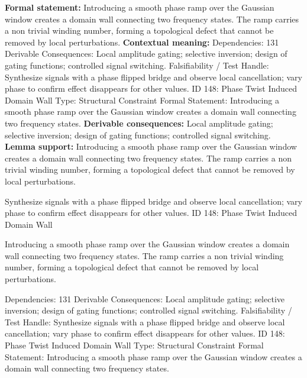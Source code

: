 \begingroup\footnotesize\setlength{\emergencystretch}{3em}\sloppy
\textbf{Formal statement:} Introducing a smooth phase ramp over the Gaussian window creates a domain wall connecting two frequency states. The ramp carries a non trivial winding number, forming a topological defect that cannot be removed by local perturbations.
\textbf{Contextual meaning:} Dependencies: 131 Derivable Consequences: Local amplitude gating; selective inversion; design of gating functions; controlled signal switching. Falsifiability / Test Handle: Synthesize signals with a phase flipped bridge and observe local cancellation; vary phase to confirm effect disappears for other values. ID 148: Phase Twist Induced Domain Wall Type: Structural Constraint Formal Statement: Introducing a smooth phase ramp over the Gaussian window creates a domain wall connecting two frequency states.
\textbf{Derivable consequences:} Local amplitude gating; selective inversion; design of gating functions; controlled signal switching.
\textbf{Lemma support:} Introducing a smooth phase ramp over the Gaussian window creates a domain wall connecting two frequency states. The ramp carries a non trivial winding number, forming a topological defect that cannot be removed by local perturbations.\par
\endgroup

Synthesize signals with a phase flipped bridge and observe local cancellation; vary phase to confirm effect disappears for other values. ID 148: Phase Twist Induced Domain Wall

Introducing a smooth phase ramp over the Gaussian window creates a domain wall connecting two frequency states. The ramp carries a non trivial winding number, forming a topological defect that cannot be removed by local perturbations.

Dependencies: 131 Derivable Consequences: Local amplitude gating; selective inversion; design of gating functions; controlled signal switching. Falsifiability / Test Handle: Synthesize signals with a phase flipped bridge and observe local cancellation; vary phase to confirm effect disappears for other values. ID 148: Phase Twist Induced Domain Wall Type: Structural Constraint Formal Statement: Introducing a smooth phase ramp over the Gaussian window creates a domain wall connecting two frequency states.
\endgroup

